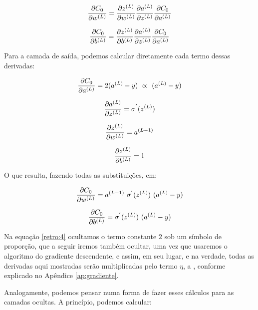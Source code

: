 \begin{equation}\label{retro:1}
\frac{\partial C_0}{\partial w^{(L)}} = \frac{\partial z^{(L)}}{\partial w^{(L)}} \frac{\partial a^{(L)}}{\partial z^{(L)}} \frac{\partial C_0}{\partial a^{(L)}}
\end{equation}

\begin{equation}\label{retro:2}
\frac{\partial C_0}{\partial b^{(L)}} = \frac{\partial z^{(L)}}{\partial b^{(L)}} \frac{\partial a^{(L)}}{\partial z^{(L)}} \frac{\partial C_0}{\partial a^{(L)}}
\end{equation}

Para a camada de saída, podemos calcular diretamente cada termo dessas derivadas:

\begin{equation}\label{retro:4}
\frac{\partial C_0}{\partial a^{(L)}} = 2(a^{(L)} - y) ~\propto~ (a^{(L)} - y)
\end{equation}

\begin{equation}\label{retro:5}
\frac{\partial a^{(L)}}{\partial z^{(L)}} = \sigma^{'}(z^{(L)})
\end{equation}

\begin{equation}\label{retro:6}
\frac{\partial z^{(L)}}{\partial w^{(L)}} = a^{(L-1)}
\end{equation}

\begin{equation}\label{retro:7}
\frac{\partial z^{(L)}}{\partial b^{(L)}} = 1
\end{equation}

O que resulta, fazendo todas as substituições, em:

\begin{equation}\label{retro:10}
\frac{\partial C_0}{\partial w^{(L)}} = a^{(L-1)}~ \sigma^{'}(z^{(L)})~ (a^{(L)} - y)
\end{equation}

\begin{equation}\label{retro:11}
\frac{\partial C_0}{\partial b^{(L)}} = \sigma^{'}(z^{(L)})~ (a^{(L)} - y)
\end{equation}

Na equação \ref{retro:4} ocultamos o termo constante $2$ sob um símbolo de proporção, que a seguir iremos também ocultar, uma vez que usaremos o algoritmo do gradiente descendente, e assim, em seu lugar, e na verdade, todas as derivadas aqui mostradas serão multiplicadas pelo termo $\eta$, a , conforme explicado no Apêndice \ref{ap:gradiente}. 

Analogamente, podemos pensar numa forma de fazer esses cálculos para as camadas ocultas. A princípio, podemos calcular:

